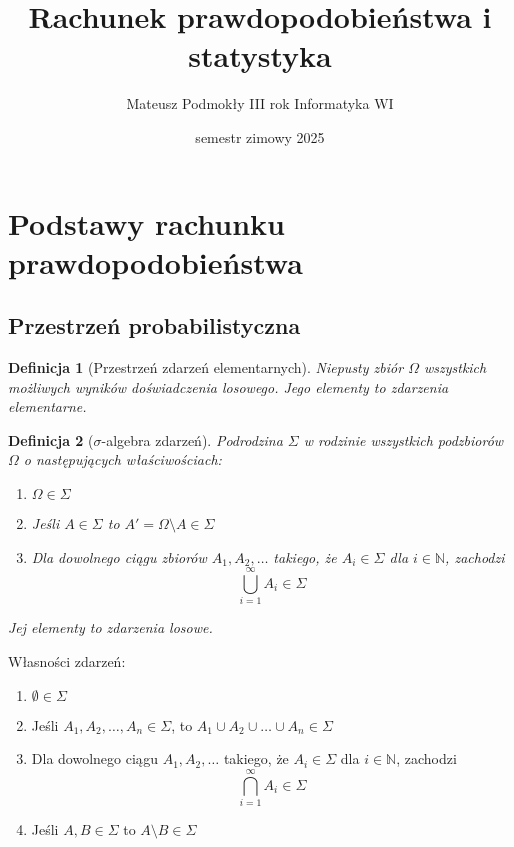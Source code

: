 \documentclass[11pt, leqno]{scrartcl}
\title{Rachunek prawdopodobieństwa i statystyka}
\author{Mateusz Podmokły III rok Informatyka WI}
\date{semestr zimowy 2025}
\theoremstyle{mydefinition}
\newtheorem{definition}{Definicja}[subsection]
\theoremstyle{mytheorem}
\begin{document}
    \maketitle
    \tableofcontents
    \newpage

    \section{Podstawy rachunku prawdopodobieństwa}
    \subsection{Przestrzeń probabilistyczna}
    \begin{definition}[Przestrzeń zdarzeń elementarnych]
        Niepusty zbiór $\Omega$ wszystkich możliwych wyników
        doświadczenia losowego. Jego elementy to zdarzenia elementarne.
    \end{definition}
    \begin{definition}[$\sigma$-algebra zdarzeń]
        Podrodzina $\Sigma$ w rodzinie wszystkich podzbiorów $\Omega$
        o następujących właściwościach:
        \begin{enumerate}
            \item $\Omega \in \Sigma$
            \item Jeśli $A \in \Sigma$ to $A'=\Omega \setminus A \in
                \Sigma$
            \item Dla dowolnego ciągu zbiorów $A_1,A_2,\ldots$ takiego,
                że $A_i \in \Sigma$ dla $i \in \mathbb{N}$, zachodzi
                \[
                    \bigcup_{i=1}^{\infty}A_i \in \Sigma
                \]
        \end{enumerate}
        Jej elementy to zdarzenia losowe.
    \end{definition}
    \noindent
    Własności zdarzeń:
    \begin{enumerate}
        \item $\emptyset \in \Sigma$
        \item Jeśli $A_1,A_2,\ldots,A_n \in \Sigma$, to
            $A_1 \cup A_2 \cup \ldots \cup A_n \in \Sigma$
        \item Dla dowolnego ciągu $A_1,A_2,\ldots$ takiego, że
            $A_i \in \Sigma$ dla $i \in \mathbb{N}$, zachodzi
            \[
                \bigcap_{i=1}^{\infty}A_i \in \Sigma
            \]
        \item Jeśli $A,B \in \Sigma$ to $A \setminus B \in \Sigma$
    \end{enumerate}
\end{document}
